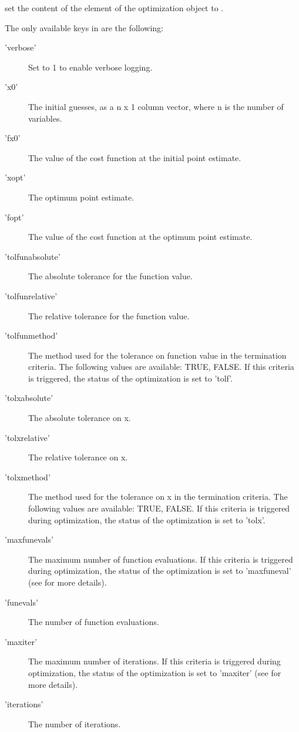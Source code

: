 \begin{Details}\relax
{} set the content of the  element of the 
optimization object  to .

The only available keys in  are the following:
\begin{description}

\item['verbose'] Set to 1 to enable verbose logging.
\item['x0'] The initial guesses, as a n x 1 column vector, where n is the
number of variables.
\item['fx0'] The value of the cost function at the initial point
estimate.
\item['xopt'] The optimum point estimate.
\item['fopt'] The value of the cost function at the optimum point 
estimate.
\item['tolfunabsolute'] The absolute tolerance for the function value.
\item['tolfunrelative'] The relative tolerance for the function value.
\item['tolfunmethod'] The method used for the tolerance on function value
in the termination criteria. The following values are available: TRUE,
FALSE. If this criteria is triggered, the status of the optimization is
set to 'tolf'.
\item['tolxabsolute'] The absolute tolerance on x.
\item['tolxrelative'] The relative tolerance on x.
\item['tolxmethod'] The method used for the tolerance on x in the
termination criteria. The following values are available: TRUE, FALSE. If
this criteria is triggered during optimization, the status of the
optimization is set to 'tolx'.
\item['maxfunevals'] The maximum number of function evaluations. If this
criteria is triggered during optimization, the status of the optimization
is set to 'maxfuneval' (see
 for more details).
\item['funevals'] The number of function evaluations.
\item['maxiter'] The maximum number of iterations. If this criteria is
triggered during optimization, the status of the optimization is set to
'maxiter' (see 
for more details).
\item['iterations'] The number of iterations.

\end{description}
\end{Details}
